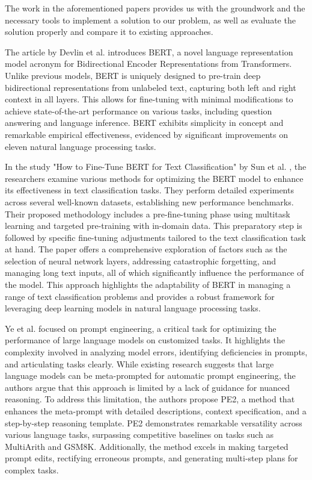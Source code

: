 \documentclass[fleqn,moreauthors,10pt]{ds_report}
\begin{document}
The work in the aforementioned papers provides us with the groundwork and the necessary tools to implement a solution to our problem, as well as evaluate the solution properly and compare it to existing approaches. 
\fi



The article by Devlin et al. \cite{devlin2019bert} introduces BERT, a novel language representation model acronym for Bidirectional Encoder Representations from Transformers. Unlike previous models, BERT is uniquely designed to pre-train deep bidirectional representations from unlabeled text, capturing both left and right context in all layers. This allows for fine-tuning with minimal modifications to achieve state-of-the-art performance on various tasks, including question answering and language inference. BERT exhibits simplicity in concept and remarkable empirical effectiveness, evidenced by significant improvements on eleven natural language processing tasks. 

In the study "How to Fine-Tune BERT for Text Classification" by Sun et al. \cite{sun2020finetune}, the researchers examine various methods for optimizing the BERT model to enhance its effectiveness in text classification tasks. They perform detailed experiments across several well-known datasets, establishing new performance benchmarks. Their proposed methodology includes a pre-fine-tuning phase using multitask learning and targeted pre-training with in-domain data. This preparatory step is followed by specific fine-tuning adjustments tailored to the text classification task at hand. The paper offers a comprehensive exploration of factors such as the selection of neural network layers, addressing catastrophic forgetting, and managing long text inputs, all of which significantly influence the performance of the model. This approach highlights the adaptability of BERT in managing a range of text classification problems and provides a robust framework for leveraging deep learning models in natural language processing tasks.

Ye et al. \cite{ye2024prompt} focused on prompt engineering, a critical task for optimizing the performance of large language models on customized tasks. It highlights the complexity involved in analyzing model errors, identifying deficiencies in prompts, and articulating tasks clearly. While existing research suggests that large language models can be meta-prompted for automatic prompt engineering, the authors argue that this approach is limited by a lack of guidance for nuanced reasoning. To address this limitation, the authors propose PE2, a method that enhances the meta-prompt with detailed descriptions, context specification, and a step-by-step reasoning template. PE2 demonstrates remarkable versatility across various language tasks, surpassing competitive baselines on tasks such as MultiArith and GSM8K. Additionally, the method excels in making targeted prompt edits, rectifying erroneous prompts, and generating multi-step plans for complex tasks.
\end{document}
